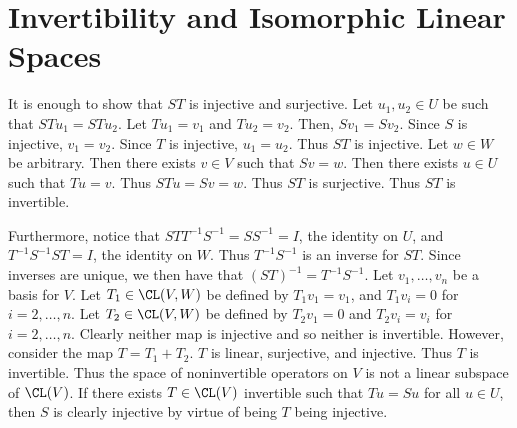 \documentclass{book}
\begin{document}
\section{Invertibility and Isomorphic Linear Spaces}
  \begin{enumerate}[label=\arabic*)]
    \ii 
      It is enough to show that $ST$ is injective and surjective. Let $u_1, u_2 \in U$ be such that $STu_1 = STu_2$. Let $Tu_1 = v_1$ and $Tu_2 = v_2$. Then, $Sv_1 = Sv_2$. Since $S$ is
      injective, $v_1 = v_2$. Since $T$ is injective, $u_1 = u_2$. Thus $ST$ is injective. Let $w \in W$ be arbitrary. Then there exists $v \in V$ such that $Sv = w$. Then there exists $u
      \in U$ such that $Tu = v$. Thus $STu = Sv = w$. Thus $ST$ is surjective. Thus $ST$ is invertible.

      Furthermore, notice that $STT^{-1}S^{-1} = SS^{-1} = I$, the identity on $U$, and $T^{-1}S^{-1}ST = I$, the identity on $W$. Thus $T^{-1}S^{-1}$ is an inverse for $ST$. Since inverses
      are unique, we then have that $(ST)^{-1} = T^{-1}S^{-1}$.
    \ii
      Let $v_1, \dots, v_n$ be a basis for $V$. Let $T_1 \in \CL(V, W)$ be defined by $T_1v_1 = v_1$, and $T_1v_i = 0$ for $i = 2, \dots, n$. Let $T_2 \in \CL(V, W)$ be defined by $T_2v_1 =
      0$ and $T_2v_i = v_i$ for $i = 2, \dots, n$. Clearly neither map is injective and so neither is invertible. However, consider the map $T = T_1 + T_2$. $T$ is linear, surjective, and
      injective. Thus $T$ is invertible. Thus the space of noninvertible operators on $V$ is not a linear subspace of $\CL(V)$.
    \ii
      If there exists $T \in \CL(V)$ invertible such that $Tu = Su$ for all $u \in U$, then $S$ is clearly injective by virtue of being $T$ being injective. 



\end{enumerate}
\end{document}
